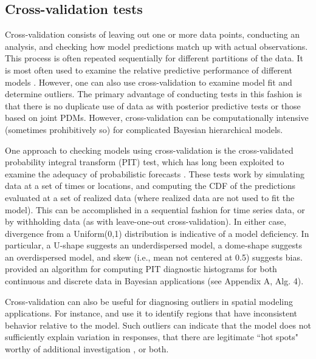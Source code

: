 \documentclass[12pt,english]{article}
\begin{document}
\begin{spacing}{1.9}
\subsection{Cross-validation tests}

Cross-validation consists of leaving out one or more data points,
conducting an analysis, and checking how model predictions match up
with actual observations.  This process is often repeated sequentially
for different partitions of the data.  It is most often used to
examine the relative predictive performance of different models
\citep[i.e., for model selection][]{ArlotCelisse2010}.  However, one
can also use cross-validation to examine model fit and determine
outliers.  The primary advantage of conducting tests in this fashion
is that there is no duplicate use of data as with posterior predictive
tests or those based on joint PDMs. However, cross-validation can be
computationally intensive (sometimes prohibitively so) for complicated
Bayesian hierarchical models.

One approach to checking models using cross-validation is the
cross-validated probability integral transform (PIT) test, which has
long been exploited to examine the adequacy of probabilistic forecasts
\citep[e.g.,][]{Dawid1984,Fruiiwirth1996,GneitingEtAl2007,CzadoEtAl2009}. These
tests work by simulating data at a set of times or locations, and
computing the CDF of the predictions evaluated at a set of realized
data (where realized data are not used to fit the model).  This can be
accomplished in a sequential fashion for time series data, or by
withholding data (as with leave-one-out cross-validation).  In either
case, divergence from a Uniform(0,1) distribution is indicative of a
model deficiency.  In particular, a U-shape suggests an underdispersed
model, a dome-shape suggests an overdispersed model, and skew (i.e.,
mean not centered at 0.5) suggests bias.  \citet{Congdon2014} provided
an algorithm for computing PIT diagnostic histograms for both
continuous and discrete data in Bayesian applications (see Appendix A,
Alg. 4).

Cross-validation can also be useful for diagnosing outliers in spatial
modeling applications.  For instance, \citet{SternCressie2000} and
\citet{MarshallSpiegelhalter2003} use it to identify regions that have
inconsistent behavior relative to the model.  Such outliers can
indicate that the model does not sufficiently explain variation in
responses, that there are legitimate ``hot spots" worthy of additional
investigation \citep{MarshallSpiegelhalter2003}, or both.


\end{spacing}
\end{document}
